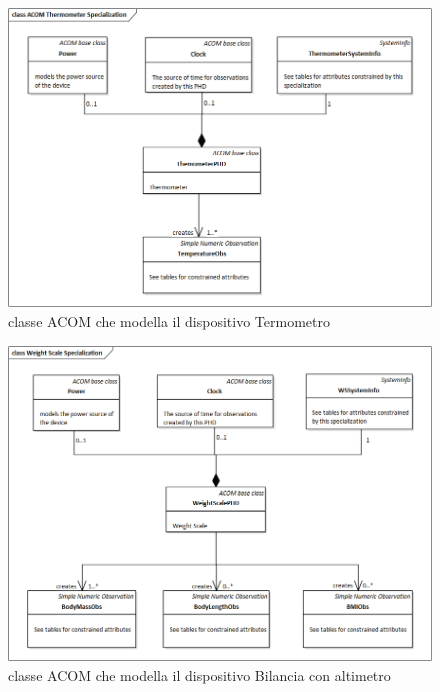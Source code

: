 \documentclass[a4paper]{article}
\begin{document}
\begin{figure}[H]
    \centering
    \includegraphics[width=1\textwidth]{figures/ACOM thermometer specialization class.png}
    \caption{classe ACOM che modella il dispositivo Termometro}
\end{figure}
\begin{figure}[H]
    \centering
    \includegraphics[width=1\linewidth]{figures/weightscale.png}
    \caption{classe ACOM che modella il dispositivo Bilancia con altimetro}
    \label{fig:enter-label}
\end{figure}
\end{document}
